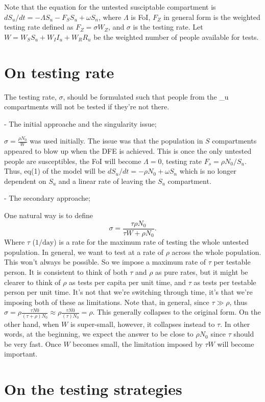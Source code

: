 Note that the equation for the untested susciptable compartment is $d S_u/dt = -\Lambda S_u - F_S S_u + \omega S_n$, where $\Lambda$ is FoI, $F_Z$ in general form is the weighted testing rate defined as $F_Z=\sigma W_Z$, and $\sigma$ is the testing rate. Let $W = W_S S_u + W_I I_u + W_R R_u$ be the weighted number of people available for tests.

\section{On testing rate}

The testing rate, $\sigma$, should be formulated such that people from the \_u compartments will not be tested if they're not there.

- The initial approache and the singularity issue;

$\sigma = \frac{\rho N_0}{W}$ was used initially. The issue was that the population in $S$ compartments appeared to blow up when the DFE is achieved. This is  once the only untested people are susceptibles, the FoI will become $\Lambda=0$, testing rate $F_s=\rho N_0/S_u$. Thus, eq(1) of the model will be $d S_u/dt = - \rho N_0 + \omega S_n$ which is no longer dependent on $S_u$ and a linear rate of leaving the $S_u$ compartment.

- The secondary approache;

One natural way is to define $$\sigma = \frac{\tau \rho N_0}{\tau W + \rho N_0}.$$
Where  $\tau$ ($1/ \mathrm{day}$) is a rate for the maximum rate of testing the whole untested population. In general, we want to test at a rate of $\rho$ across the whole population. This won't always be possible. So we impose a maximum rate of $\tau$ per testable person. It is consistent to think of both $\tau$ and $\rho$ as pure rates, but it might be clearer to think of $\rho$ as tests per capita per unit time, and $\tau$ as tests per testable person per unit time. It's not that we're switching through time, it's that we're imposing both of these as limitations. Note that, in general, since $\tau \gg \rho$, thus $\sigma=\rho \frac{\tau N0}{(\tau+\rho)N_0} \approx \rho \frac{\tau N0}{(\tau)N_0} = \rho$. This generally collapses to the original form. On the other hand, when $W$ is super-small, however, it collapses instead to $\tau$.
  In other words, at the beginning, we expect the answer to be close to $\rho N_0$ since $\tau$ should be very fast. Once $W$ becomes small, the limitation imposed by $\tau W$ will become important.
  
\section{ On the testing strategies}


